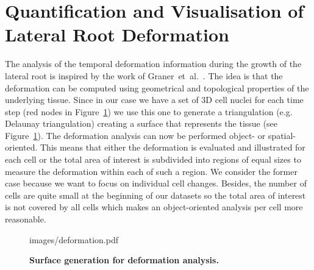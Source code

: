 \documentclass[11pt,a4paper, draft]{article}
\begin{document}
\section{Quantification and Visualisation of Lateral Root Deformation}
\noindent
The analysis of the temporal deformation information during the growth of the lateral root is inspired by the work of Graner~et~al.~\cite{graner_et_al_2008}. The idea is that the deformation can be computed using geometrical and topological properties of the underlying tissue. Since in our case we have a set of 3D cell nuclei for each time step (red nodes in Figure~\ref{fig:deformation}) we use this one to generate a triangulation (e.g. Delaunay triangulation) creating a surface that represents the tissue (see Figure~\ref{fig:deformation}). The deformation analysis can now be performed object- or spatial-oriented. This means that either the deformation is evaluated and illustrated for each cell or the total area of interest is subdivided into regions of equal sizes to measure the deformation within each of such a region. We consider the former case because we want to focus on individual cell changes. Besides, the number of cells are quite small at the beginning of our datasets so the total area of interest is not covered by all cells which makes an object-oriented analysis per cell more reasonable.
%
\begin{figure}[htbp]
	\begin{center}
		\begin{overpic}[width=1.\linewidth]{images/deformation.pdf}
		\end{overpic}
\caption[Surface generation for deformation analysis.]
{
{\bf Surface generation for deformation analysis.}
}
	\label{fig:deformation}
	\end{center}
\end{figure}
%
\end{document}
